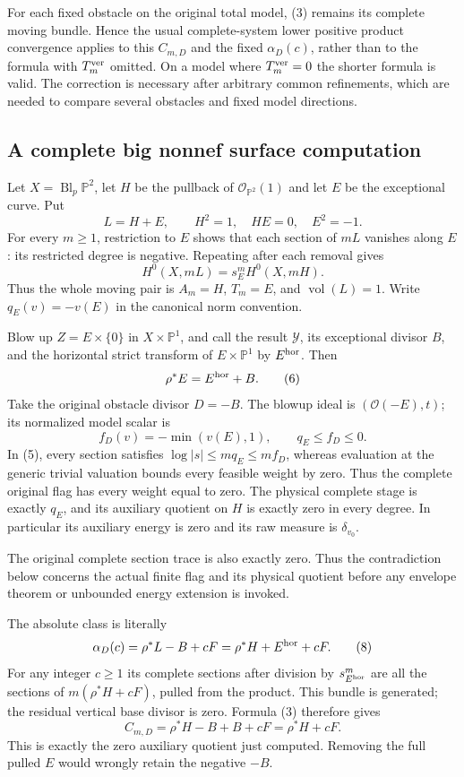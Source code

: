 \documentclass[10pt]{article}
\newcommand{\vol}{\operatorname{vol}}
\newcommand{\OO}{\mathcal O}
\begin{document}
For each fixed obstacle on the original total model, (3) remains its
complete moving bundle. Hence the usual complete-system lower positive
product convergence applies to this $C_{m,D}$ and the fixed
$\alpha_D(c)$, rather than to the formula with $T_m^{\rm ver}$ omitted.
On a model where $T_m^{\rm ver}=0$ the shorter formula is valid.
The correction is necessary after arbitrary common refinements, which
are needed to compare several obstacles and fixed model directions.

\subsection{A complete big nonnef surface computation}
Let $X=\operatorname{Bl}_p\mathbb P^2$, let $H$ be the pullback of
$\OO_{\mathbb P^2}(1)$ and let $E$ be the exceptional curve. Put
\[
 L=H+E,\qquad H^2=1,\quad H E=0,\quad E^2=-1.
\]
For every $m\geq1$, restriction to $E$ shows that each section of
$mL$ vanishes along $E$: its restricted degree is negative. Repeating
after each removal gives
\[
 H^0(X,mL)=s_E^m H^0(X,mH).
                                                        \tag{5}
\]
Thus the whole moving pair is $A_m=H$, $T_m=E$, and $\vol(L)=1$.
Write $q_E(v)=-v(E)$ in the canonical norm convention.

Blow up $Z=E\times\{0\}$ in $X\times\mathbb P^1$, and call the
result $\mathcal Y$, its exceptional divisor $B$, and the horizontal
strict transform of $E\times\mathbb P^1$ by $E^{\rm hor}$. Then
\[
 \rho^*E=E^{\rm hor}+B.                                \tag{6}
\]
Take the original obstacle divisor $D=-B$. The blowup ideal is
$(\OO(-E),t)$; its normalized model scalar is
\[
 f_D(v)=-\min(v(E),1),\qquad q_E\leq f_D\leq0.         \tag{7}
\]
In (5), every section satisfies $\log|s|\leq mq_E\leq mf_D$,
whereas evaluation at the generic trivial valuation bounds every
feasible weight by zero. Thus the complete original flag has every
weight equal to zero. The physical complete stage is exactly $q_E$,
and its auxiliary quotient on $H$ is exactly zero in every degree.
In particular its auxiliary energy is zero and its raw measure is
$\delta_{v_0}$.

The original complete section trace is also exactly zero. Thus the
contradiction below concerns the actual finite flag and its physical
quotient before any envelope theorem or unbounded energy extension
is invoked.

The absolute class is literally
\[
 \alpha_D(c)=\rho^*L-B+cF
            =\rho^*H+E^{\rm hor}+cF.                   \tag{8}
\]
For any integer $c\geq1$ its complete sections after division by
$s_{E^{\rm hor}}^m$ are all the sections of
$m(\rho^*H+cF)$, pulled from the product. This bundle is generated;
the residual vertical base divisor is zero. Formula (3) therefore gives
\[
 C_{m,D}=\rho^*H-B+B+cF=\rho^*H+cF.                    \tag{9}
\]
This is exactly the zero auxiliary quotient just computed. Removing
the full pulled $E$ would wrongly retain the negative $-B$.
\end{document}
